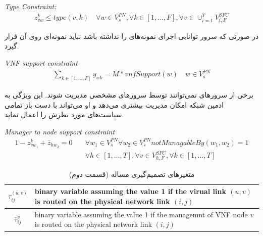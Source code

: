 \begin{latin}
    \textit{Type Constraint:}
    \begin{align}
        z_{vw}^{k} \le type(v, k)
        \quad
        \forall w \in V_{s}^{PN},
        \forall k \in [1,\ldots, F],
        \forall v \in \cup_{i=1}^T V_{i, F}^{SFC}
    \end{align}
\end{latin}

در صورتی که سرور 
توانایی اجرای نمونه‌های 
را نداشته باشد نباید نمونه‌ای روی آن قرار گیرد.

\begin{latin}
    \textit{VNF support constraint}
    \begin{align}
        \sum_{k \in [1, \dots, F]} y_{wk}  = M * vnfSupport(w)
        \quad
        w \in V_{s}^{PN}
    \end{align}
\end{latin}

برخی از سرورهای نمی‌توانند توسط سرورهای مشخصی مدیریت شوند.
این ویژگی به ادمین شبکه امکان مدیریت بیشتری می‌دهد و او می‌تواند با دست باز تمامی
سیاست‌های مورد نظرش را اعمال نماید.

\begin{latin}
    \textit{Manager to node support constraint}
    \begin{align}
        1 - z_{vw_1}^k + \bar{z}_{hw_2} = 0
        \quad
        & \forall w_1 \in V_s^{PN} \forall w_2 \in V_s^{PN} notManagableBy(w_1, w_2) = 1 \nonumber \\
        & \forall h \in [1,\dots,T],
        \forall v \in V_{h,F}^{SFC},
        \forall k \in [1,\dots,T]
    \end{align}
\end{latin}

\begin{table}[h!]
    \vspace{0.5cm}
    \caption{متغیرهای تصمیم‌گیری مساله (قسمت دوم)}
    \begin{center}\begin{latin}\begin{tabular}{|c|p{10cm}|}
    \hline
    \(\tau^{(u,v)}_{ij}\) & binary variable assuming the value 1 if the virual link \((u,v)\) is routed on the physical network link \((i,j)\) \\
    \hline
    \(\bar{\tau}^{v}_{ij}\) & binary variable assuming the value 1 if the managemnt of VNF node $v$ is routed on the physical network link \((i,j)\) \\
    \hline
    \end{tabular}\end{latin}\end{center}
\end{table}

